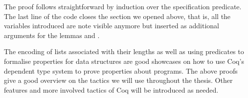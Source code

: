 The proof follows straightforward by induction over the specification predicate.
The last line of the code closes the section we opened above, that is, all the variables introduced are note visible anymore but inserted as additional arguments for the lemmas  and .


The encoding of lists associated with their lengths as well as using predicates to formalise properties for data structures are good showcases on how to use Coq's dependent type system to prove properties about programs.
The above proofs give a good overview on the tactics we will use throughout the thesis.
Other features and more involved tactics of Coq will be introduced as needed.

%
%




